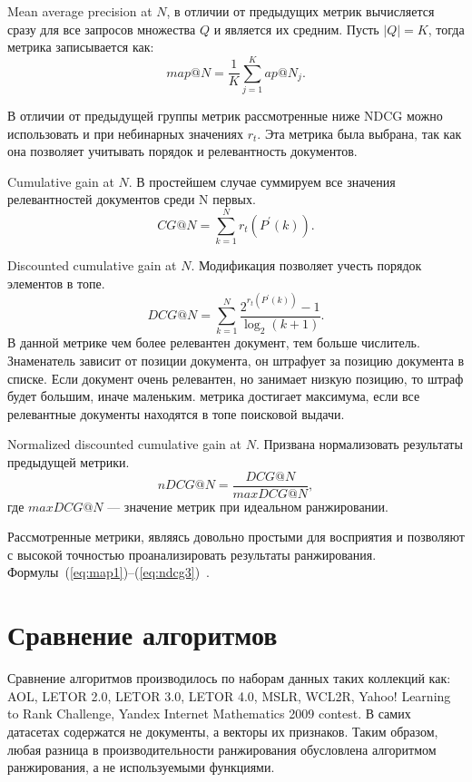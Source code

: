 Mean average precision at $N$, в отличии от предыдущих метрик вычисляется сразу для все запросов множества $Q$ и является их средним. Пусть $|Q| = K$, тогда метрика записывается как:
\begin{equation}
	\label{eq:map3}
	map @ N=\frac{1}{K} \sum_{j=1}^K ap @ N_j.
\end{equation}

В отличии от предыдущей группы метрик рассмотренные ниже NDCG можно использовать и при небинарных значениях $r_t$. Эта метрика была выбрана, так как она позволяет учитывать порядок и релевантность документов.

Cumulative gain at $N$. В простейшем случае суммируем все значения релевантностей документов среди N первых.
\begin{equation}
	\label{eq:ndcg1}
	CG @ N= \sum_{k=1}^N r_t(P^{\prime}(k)).
\end{equation}

Discounted cumulative gain at $N$. Модификация позволяет учесть порядок элементов в топе.
\begin{equation}
	\label{eq:ndcg2}
	D C G @ N=\sum_{k=1}^N \frac{2^{r_t(P^{\prime}(k))}-1}{\log _2(k+1)}.
\end{equation}
В данной метрике чем более релевантен документ, тем больше числитель. Знаменатель зависит от позиции документа, он штрафует за позицию документа в списке. Если документ очень релевантен, но занимает низкую позицию, то штраф будет большим, иначе маленьким. метрика достигает максимума, если все релевантные документы находятся в топе поисковой выдачи.

Normalized discounted cumulative gain at $N$. Призвана нормализовать результаты предыдущей метрики.
\begin{equation}
	\label{eq:ndcg3}
	nD C G @ N=\frac{D C G @ N}{maxD C G @ N},
\end{equation}
где $maxD C G @ N$ --- значение метрик при идеальном ранжировании.

Рассмотренные метрики, являясь довольно простыми для восприятия и позволяют с высокой точностью проанализировать результаты ранжирования. Формулы~(\ref{eq:map1})--(\ref{eq:ndcg3})~\cite{metrics}.

\section{Сравнение алгоритмов}

Сравнение алгоритмов производилось по наборам данных таких коллекций как: AOL, LETOR 2.0, LETOR 3.0, LETOR 4.0, MSLR, WCL2R, Yahoo! Learning to Rank Challenge, Yandex Internet Mathematics 2009 contest. В самих датасетах содержатся не документы, а векторы их признаков. Таким образом, любая разница в производительности ранжирования обусловлена алгоритмом ранжирования, а не используемыми функциями.

